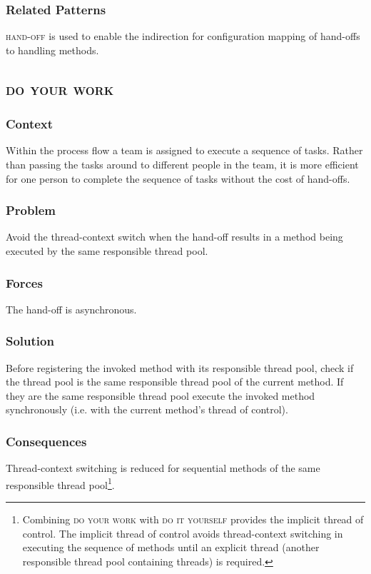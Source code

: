 \documentclass[prodmode]{style/acmlarge}
\begin{document}
\subsubsection*{Related Patterns} \textsc{hand-off} is used to enable the
indirection for configuration mapping of hand-offs to handling methods.




\subsection{\textsc{\textbf{do your work}}}

\subsubsection*{Context} Within the process flow a team is assigned to execute a
sequence of tasks. Rather than passing the tasks around to different people in
the team, it is more efficient for one person to complete the sequence of tasks
without the cost of hand-offs.

\subsubsection*{Problem} Avoid the thread-context switch when the hand-off
results in a method being executed by the same responsible thread pool.

\subsubsection*{Forces} The hand-off is asynchronous.

\subsubsection*{Solution} Before registering the invoked method with its
responsible thread pool, check if the thread pool is the same responsible thread
pool of the current method.  If they are the same responsible thread pool
execute the invoked method synchronously (i.e. with the current method's thread
of control).

\subsubsection*{Consequences} Thread-context switching is reduced for sequential
methods of the same responsible thread pool\footnote{Combining \textsc{do your
work} with \textsc{do it yourself} provides the implicit thread of control.  The
implicit thread of control avoids thread-context switching in executing the
sequence of methods until an explicit thread (another responsible thread pool
containing threads) is required.}.
\end{document}
